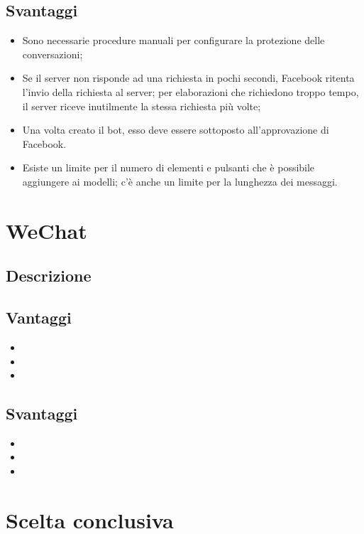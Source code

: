 \documentclass[11pt,notitlepage]{article}
\begin{document}
\subsection*{Svantaggi}
\begin{itemize}
		\item Sono necessarie procedure manuali per configurare la protezione delle conversazioni;
		\item Se il server non risponde ad una richiesta in pochi secondi, Facebook ritenta l'invio della richiesta al server; per elaborazioni che richiedono troppo tempo, il server riceve inutilmente la stessa richiesta più volte;
		\item Una volta creato il bot, esso deve essere sottoposto all'approvazione di Facebook.
		\item Esiste un limite per il numero di elementi e pulsanti che è possibile aggiungere ai modelli; c'è anche un limite per la lunghezza dei messaggi.
\end{itemize} 

\bigskip
\section*{WeChat}
\subsection*{Descrizione}

\subsection*{Vantaggi}
\begin{itemize}
		\item 
		\item  
		\item 
\end{itemize} 

\subsection*{Svantaggi}
\begin{itemize}
		\item 
		\item  
		\item 
\end{itemize} 

\bigskip
\section*{Scelta conclusiva}
\end{document}

